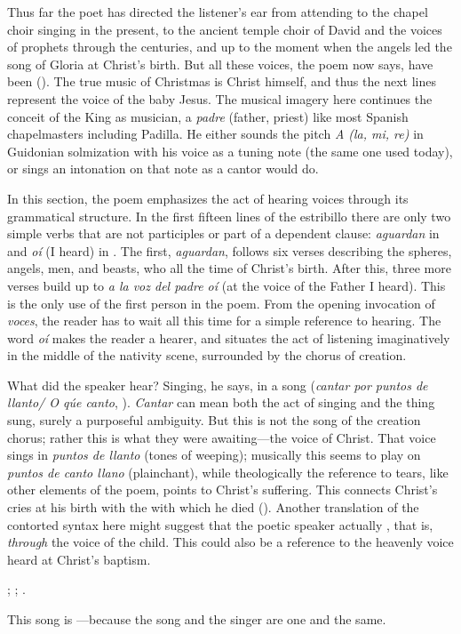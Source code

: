 Thus far the poet has directed the listener's ear from attending to the chapel
choir singing in the present, to the ancient temple choir of David and the
voices of prophets through the centuries, and up to the moment when the angels
led the song of Gloria at Christ's birth.
But all these voices, the poem now says, have been  ().
The true music of Christmas is Christ himself, and thus the next lines represent
the voice of the baby Jesus.
The musical imagery here continues the conceit of the King as musician, a
\emph{padre} (father, priest) like most Spanish chapelmasters including Padilla.
He either sounds the pitch \emph{A (la, mi, re)} in Guidonian solmization with
his voice as a tuning note (the same one used today), or sings an intonation on
that note as a cantor would do.

In this section, the poem emphasizes the act of hearing voices through its
grammatical structure.
In the first fifteen lines of the estribillo there are only two simple verbs
that are not participles or part of a dependent clause: \emph{aguardan} in
 and \emph{oí} (I heard) in .
The first, \emph{aguardan}, follows six verses describing the spheres, angels,
men, and beasts, who all  the time of Christ's birth.
After this, three more verses build up to \emph{a la voz del padre oí} (at the
voice of the Father I heard).
This is the only use of the first person in the poem.
From the opening invocation of \emph{voces}, the reader has to wait all this
time for a simple reference to hearing.
The word \emph{oí} makes the reader a hearer, and situates the act of listening
imaginatively in the middle of the nativity scene, surrounded by the chorus of
creation.

What did the speaker hear? 
Singing, he says, in a song (\emph{cantar por puntos de llanto/ O qúe canto},
).
\emph{Cantar} can mean both the act of singing and the thing sung, surely a
purposeful ambiguity.
But this is not the song of the creation chorus; rather this is what they were
awaiting---the voice of Christ.
That voice sings in \emph{puntos de llanto} (tones of weeping); musically this
seems to play on \emph{puntos de canto llano} (plainchant), while theologically
the reference to tears, like other elements of the poem, points to Christ's
suffering.
This connects Christ's cries at his birth with the  with
which he died ().
Another translation of the contorted syntax here might suggest that the poetic
speaker actually , that is,
\emph{through} the voice of the child.
This could also be a reference to the heavenly voice heard at Christ's baptism.%
\begin{Footnote} 
    ; ; .
\end{Footnote}
This song is ---because
the song and the singer are one and the same.

